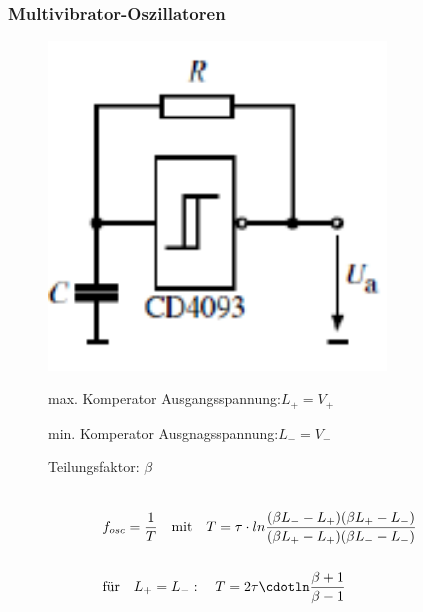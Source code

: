 \subsubsection{Multivibrator-Oszillatoren}
\begin{figure}[h!]
	\begin{minipage}{0.3\textwidth} 
	\includegraphics[width=0.8\textwidth]{images/Multivibrator_Komp}
	\end{minipage}
	\begin{minipage}{0.6\textwidth}
      \begin{compactitem}
        \item max. Komperator Ausgangsspannung:\quad $L_+=V_+$
        \item min. Komperator Ausgnagsspannung:\quad $L_-=V_-$
        \item Teilungsfaktor: $\beta$\\\\
       \end{compactitem}
      \begin{equation*} 
        \begin{split} 
          &f_{osc}=\frac{1}{T} \quad \text{mit} \quad T=\tau \cdot ln \frac{(\beta L_- - L_+)(\beta L_+ - L_-)}{(\beta L_+ - L_+)(\beta L_- - L_-)}\\\\
          & \text{für} \quad   L_+=L_-: \quad  T=2\tau \cdotln\frac{\beta+1}{\beta-1}\\\\
        \end{split} 
      \end{equation*}
	\end{minipage}
\end{figure}

